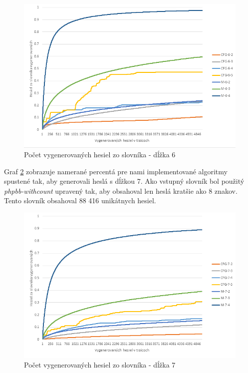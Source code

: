 \begin{figure}[ht]
    \centering
    \includegraphics[width=1\textwidth]{sameDictAcc6}
    \caption{Počet vygenerovaných hesiel zo slovníka - dĺžka 6}
    \label{fig:Acc6}
\end{figure}

\pargraph{}
Graf \ref{fig:Acc7} zobrazuje namerané percentá pre nami implementované algoritmy spustené tak, aby generovali heslá s dĺžkou 7. Ako vstupný slovník bol použitý \emph{phpbb-withcount} upravený tak, aby obsahoval len heslá kratšie ako 8 znakov. Tento slovník obsahoval 88 416 unikátnych hesiel.

\begin{figure}[ht]
    \centering
    \includegraphics[width=1\textwidth]{sameDictAcc7}
    \caption{Počet vygenerovaných hesiel zo slovníka - dĺžka 7}
    \label{fig:Acc7}
\end{figure}

